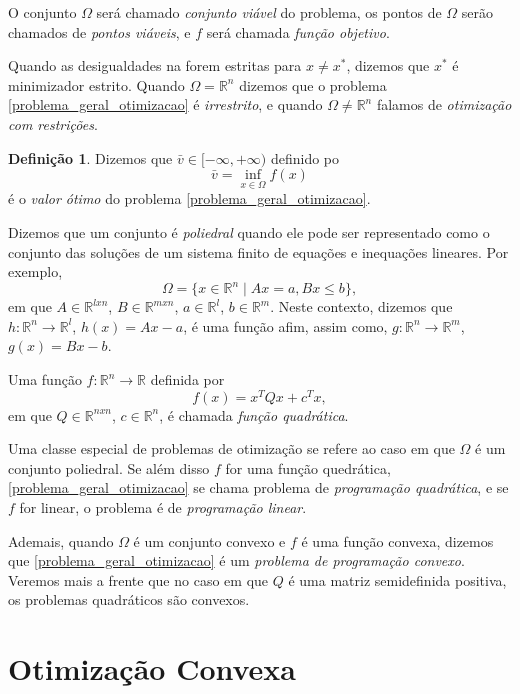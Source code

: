 \documentclass[12pt,a4paper]{scrartcl}
\def\RR{\mathds{R}}
\theoremstyle{definition}%
\newtheorem{defi}{Definição}
\begin{document}
O conjunto $\Omega$ será chamado \emph{conjunto viável} do problema, os pontos de $\Omega$ serão chamados de \emph{pontos viáveis}, e $f$ será chamada \emph{função objetivo}.


Quando as desigualdades na  forem estritas para $x \neq x^{*}$, dizemos que $x^{*}$ é minimizador estrito. Quando $\Omega = \RR^{n}$ dizemos que o problema \eqref{problema_geral_otimizacao} é \emph{irrestrito}, e quando $\Omega \neq \RR^{n}$ falamos de \emph{otimização com restrições}.


\begin{defi}
Dizemos que $\bar{v} \in [-\infty, +\infty )$ definido po
\[
\bar{v} = \inf_{x \in \Omega} f(x)
\]
é o \emph{valor ótimo} do problema \eqref{problema_geral_otimizacao}.
\end{defi}


Dizemos que um conjunto é \emph{poliedral} quando ele pode ser representado como o conjunto das soluções de um sistema finito de equações e inequações lineares. Por exemplo,
\[
\Omega = \{ x \in \RR^{n} \mid Ax = a, Bx \leq b \},
\]
em que $A \in \RR^{lxn}$, $B \in \RR^{mxn}$, $a \in \RR^{l}$, $b \in \RR^{m}$. Neste contexto, dizemos que $h:\RR^{n} \rightarrow \RR^{l}$, $h(x) = Ax-a$, é uma função afim, assim como, $g:\RR^{n}\rightarrow \RR^{m}$, $g(x) = Bx - b$.

Uma função $f:\RR^{n} \rightarrow \RR$ definida por
\[
f(x) = x^{T}Qx + c^{T}x ,
\]
em que $Q \in \RR^{nxn}$, $c \in \RR^{n}$, é chamada \emph{função quadrática}.

Uma classe especial de problemas de otimização se refere ao caso em que $\Omega$ é um conjunto poliedral. Se além disso $f$ for uma função quedrática, \eqref{problema_geral_otimizacao} se chama problema de \emph{programação quadrática}, e se $f$ for linear, o problema é de \emph{programação linear}.

Ademais, quando $\Omega$ é um conjunto convexo e $f$ é uma função convexa, dizemos que \eqref{problema_geral_otimizacao} é um \emph{problema de programação convexo}. Veremos mais a frente que no caso em que $Q$ é uma matriz semidefinida positiva, os problemas quadráticos são convexos.




\section{Otimização Convexa}
\end{document}
